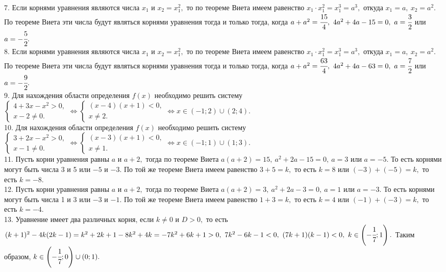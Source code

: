 \documentclass[12pt]{article}
\begin{document}
7. Если корнями уравнения являются числа $x_1$ и $x_2=x_1^2,$ то по теореме Виета имеем равенство $x_1\cdot x_1^2=x_1^3=a^3,$ откуда $x_1=a,\ x_2=a^2.$ По теореме Виета эти числа будут являться корнями уравнения тогда и только тогда, когда $a+a^2=\cfrac{15}{4},\ 4a^2+4a-15=0,\ a=\cfrac{3}{2}$ или $a=-\cfrac{5}{2}.$\\
8. Если корнями уравнения являются числа $x_1$ и $x_2=x_1^2,$ то по теореме Виета имеем равенство $x_1\cdot x_1^2=x_1^3=a^3,$ откуда $x_1=a,\ x_2=a^2.$ По теореме Виета эти числа будут являться корнями уравнения тогда и только тогда, когда $a+a^2=\cfrac{63}{4},\ 4a^2+4a-63=0,\ a=\cfrac{7}{2}$ или $a=-\cfrac{9}{2}.$\\
9. Для нахождения области определения $f(x)$ необходимо решить систему $\begin{cases} 4+3x-x^2>0,\\ x-2\neq0.\end{cases}\Leftrightarrow
\begin{cases} (x-4)(x+1)<0,\\ x\neq2.\end{cases}\Leftrightarrow x\in(-1;2)\cup(2;4).$\\
10. Для нахождения области определения $f(x)$ необходимо решить систему $\begin{cases} 3+2x-x^2>0,\\ x-1\neq0.\end{cases}\Leftrightarrow
\begin{cases} (x-3)(x+1)<0,\\ x\neq1.\end{cases}\Leftrightarrow x\in(-1;1)\cup(1;3).$\\
11. Пусть корни уравнения равны $a$ и $a+2,$ тогда по теореме Виета $a(a+2)=15,\ a^2+2a-15=0,\ a=3$ или $a=-5.$ То есть корнями могут быть числа 3 и 5 или $-5$ и $-3.$ По той же теореме Виета имеем равенство $3+5=k,$ то есть $k=8$ или $(-3)+(-5)=k,$ то есть $k=-8.$\\
12. Пусть корни уравнения равны $a$ и $a+2,$ тогда по теореме Виета $a(a+2)=3,\ a^2+2a-3=0,\ a=1$ или $a=-3.$ То есть корнями могут быть числа 1 и 3 или $-3$ и $-1.$ По той же теореме Виета имеем равенство $1+3=k,$ то есть $k=4$ или $(-1)+(-3)=k,$ то есть $k=-4.$\\
13. Уравнение имеет два различных корня, если $k\neq0$ и $D>0,$ то есть $(k+1)^2-4k(2k-1)=k^2+2k+1-8k^2+4k=-7k^2+6k+1>0,\ 7k^2-6k-1<0,\ (7k+1)(k-1)<0,\ k\in\left(-\cfrac{1}{7};1\right).$ Таким образом, $k\in\left(-\cfrac{1}{7};0\right)\cup(0;1).$\\
\end{document}
